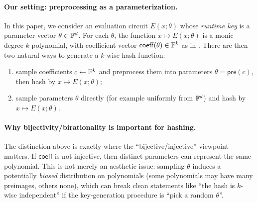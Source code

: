 \paragraph{Our setting: preprocessing as a parameterization.}
In this paper, we consider an evaluation circuit $E(x;\theta)$ whose \emph{runtime key} is a
parameter vector $\theta\in\mathbb{F}^d$.
For each $\theta$, the function $x\mapsto E(x;\theta)$ is a monic degree-$k$ polynomial, with
coefficient vector $\mathsf{coeff}(\theta)\in\mathbb{F}^k$ as in .
There are then two natural ways to generate a $k$-wise hash function:
\begin{enumerate}
  \item sample coefficients $c\gets\mathbb{F}^k$ and preprocess them into parameters
        $\theta=\mathsf{pre}(c)$, then hash by $x\mapsto E(x;\theta)$;
  \item sample parameters $\theta$ directly (for example uniformly from $\mathbb{F}^d$) and hash by
        $x\mapsto E(x;\theta)$.
\end{enumerate}

\paragraph{Why bijectivity/birationality is important for hashing.}
The distinction above is exactly where the ``bijective/injective'' viewpoint matters.
If $\mathsf{coeff}$ is not injective, then distinct parameters can represent the same polynomial.
This is not merely an aesthetic issue: sampling $\theta$ induces a potentially \emph{biased}
distribution on polynomials (some polynomials may have many preimages, others none),
which can break clean statements like ``the hash is $k$-wise independent'' if the key-generation
procedure is ``pick a random $\theta$''.

